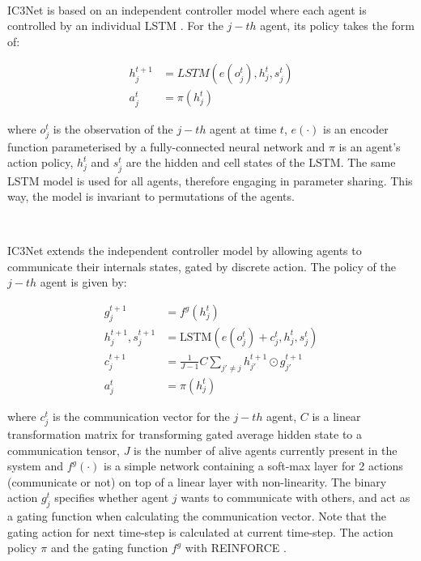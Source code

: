 \documentclass{article}
\begin{document}
\

IC3Net is based on an independent controller model where each agent is controlled by an individual LSTM \citep{hochreiter1997long}. For the $j-th$ agent, its policy takes the form of:

\begin{equation}
	\begin{aligned}
		h_j^{t + 1} &= LSTM(e(o_j^t), h_j^t, s_j^t) \\
		a^t_j &= \pi(h^t_j)
	\end{aligned}
\end{equation}

where $o_j^t$ is the observation of the $j-th$ agent at time $t$, $e(\cdot)$ is an encoder function parameterised by a fully-connected neural network and $\pi$ is an agent’s action policy, $h^t_j$ and $s^t_j$ are the hidden and cell states of the LSTM. The same LSTM model is used for all agents, therefore engaging in parameter sharing. This way, the model is invariant to permutations of the agents. \citep{singh2018ic3net}

\

IC3Net extends the independent controller model by allowing agents to communicate their internals states, gated by discrete action. The policy of the $j-th$ agent is given by:

\begin{align*}
    g_j^{t+1} &= f^g\left(h_j^t\right) \\
    h_j^{t+1}, s_j^{t+1} &= \text{LSTM}\left(e\left(o_j^t\right) + c_j^t, h_j^t, s_j^t\right) \\
    c_j^{t+1} &= \frac{1}{J-1} C \sum_{j' \neq j} h_{j'}^{t+1} \odot g_{j'}^{t+1} \\
    a_j^t &= \pi\left(h_j^t\right)
\end{align*}

where $c^t_j$ is the communication vector for the $j-th$ agent, $C$ is a linear transformation matrix for transforming gated average hidden state to a communication tensor, $J$ is the number of alive agents currently present in the system and $f^g(\cdot)$ is a simple network containing a soft-max layer for 2 actions (communicate or not) on top of a linear layer with non-linearity. The binary action $g^t_j$ specifies whether agent $j$ wants to communicate with others, and act as a gating function when calculating the communication vector. Note that the gating action for next time-step is calculated at current time-step. The action policy $\pi$ and the gating function $f^g$ with REINFORCE \cite{williams1992simple}.
\end{document}
